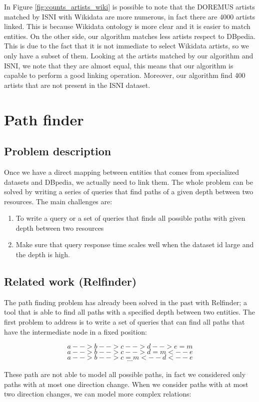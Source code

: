 \documentclass[paper=a4, fontsize=11pt]{scrartcl}
\newcommand{\textapprox}{\raisebox{0.5ex}{\texttildelow}}
\begin{document}
In Figure \ref{fig:counts_artists_wiki} is possible to note that the DOREMUS artists matched by ISNI with Wikidata are more numerous, in fact there are 4000 artists linked. This is because Wikidata ontology is more clear and it is easier to match entities.
On the other side, our algorithm matches less artists respect to DBpedia. This is due to the fact that it is not immediate to select Wikidata artists, so we only have a subset of them.
Looking at the artists matched by our algorithm and ISNI, we note that they are almost equal, this means that our algorithm is capable to perform a good linking operation. Moreover, our algorithm find \textapprox400 artists that are not present in the ISNI dataset.

\section{Path finder}
\subsection{Problem description}
Once we have a direct mapping between entities that comes from specialized datasets and DBpedia, we actually need to link them.
The whole problem can be solved by writing a series of queries that find paths of a given depth between two resources.
The main challenges are:
\begin{enumerate}
\item To write a query or a set of queries that finds all possible paths with given depth between two resources
\item Make sure that query response time scales well when the dataset id large and the depth is high.
\end{enumerate}

\subsection{Related work (Relfinder)}
The path finding problem has already been solved in the past with Relfinder; a tool that is able to find all paths with a specified depth between two entities.
The first problem to address is to write a set of queries that can find all paths that have the intermediate node in a fixed position:

$$a-->b-->c-->d-->e=m$$
$$a-->b-->c-->d=m<--e$$
$$a-->b-->c=m<--d<--e$$
$$\cdots$$

These path are not able to model all possible paths, in fact we considered only paths with at most one direction change.
When we consider paths with at most two direction changes, we can model more complex relations:
\end{document}
